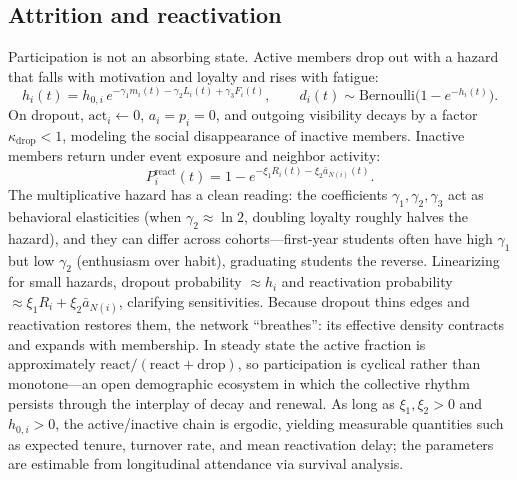 \documentclass[11pt]{article}
\begin{document}
\subsection{Attrition and reactivation}\label{sec:attrition}
Participation is not an absorbing state. Active members drop out with a hazard that falls with motivation and loyalty and rises with fatigue:
\begin{equation}\tag{13}\label{eq:hazard}
h_i(t)=h_{0,i}\,e^{-\gamma_1 m_i(t)-\gamma_2 L_i(t)+\gamma_3 F_i(t)},\qquad d_i(t)\sim\mathrm{Bernoulli}\!\big(1-e^{-h_i(t)}\big).
\end{equation}
On dropout, $\mathrm{act}_i\!\leftarrow\!0$, $a_i=p_i=0$, and outgoing visibility decays by a factor $\kappa_{\mathrm{drop}}<1$, modeling the social disappearance of inactive members. Inactive members return under event exposure and neighbor activity:
\begin{equation}\tag{14}\label{eq:react}
P^{\mathrm{react}}_i(t)=1-e^{-\xi_1 R_i(t)-\xi_2\bar a_{N(i)}(t)}.
\end{equation}
The multiplicative hazard has a clean reading: the coefficients $\gamma_1,\gamma_2,\gamma_3$ act as behavioral elasticities (when $\gamma_2\approx\ln 2$, doubling loyalty roughly halves the hazard), and they can differ across cohorts---first-year students often have high $\gamma_1$ but low $\gamma_2$ (enthusiasm over habit), graduating students the reverse. Linearizing for small hazards, dropout probability $\approx h_i$ and reactivation probability $\approx\xi_1 R_i+\xi_2\bar a_{N(i)}$, clarifying sensitivities. Because dropout thins edges and reactivation restores them, the network ``breathes'': its effective density contracts and expands with membership. In steady state the active fraction is approximately $\mathrm{react}/(\mathrm{react}+\mathrm{drop})$, so participation is cyclical rather than monotone---an open demographic ecosystem in which the collective rhythm persists through the interplay of decay and renewal. As long as $\xi_1,\xi_2>0$ and $h_{0,i}>0$, the active/inactive chain is ergodic, yielding measurable quantities such as expected tenure, turnover rate, and mean reactivation delay; the parameters are estimable from longitudinal attendance via survival analysis.
\end{document}
